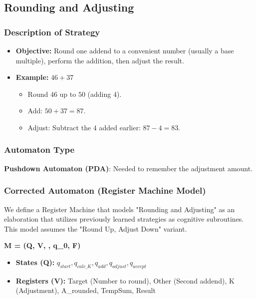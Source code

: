 \documentclass[11pt]{article}
\begin{document}
 
 
 
 
 

\subsection*{Rounding and Adjusting}

\subsubsection*{Description of Strategy}

\begin{itemize}
    \item \textbf{Objective:} Round one addend to a convenient number (usually a base multiple), perform the addition, then adjust the result.
    \item \textbf{Example:} $46 + 37$
    \begin{itemize}
        \item Round $46$ up to $50$ (adding $4$).
        \item Add: $50 + 37 = 87$.
        \item Adjust: Subtract the $4$ added earlier: $87 - 4 = 83$.
    \end{itemize}
\end{itemize}

\subsubsection*{Automaton Type}
\textbf{Pushdown Automaton (PDA)}: Needed to remember the adjustment amount.

\subsubsection*{Corrected Automaton (Register Machine Model)}

We define a Register Machine that models "Rounding and Adjusting" as an elaboration that utilizes previously learned strategies as cognitive subroutines. This model assumes the "Round Up, Adjust Down" variant.

\textbf{M = (Q, V, \delta, q_0, F)}

\begin{itemize}
    \item \textbf{States (Q):} {$q_{start}, q_{calc\_K}, q_{add}, q_{adjust}, q_{accept}$}
    \item \textbf{Registers (V):} {Target (Number to round), Other (Second addend), K (Adjustment), A\_rounded, TempSum, Result}
\end{itemize}
\end{document}
